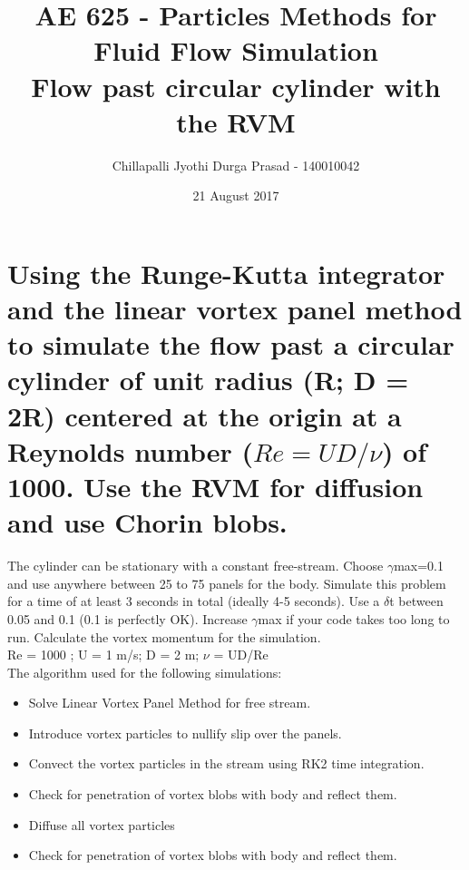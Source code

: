 \documentclass[a4paper,11pt]{article}
\title{AE 625 - Particles Methods for Fluid Flow Simulation \\ Flow past circular cylinder with the RVM}
\author{Chillapalli Jyothi Durga Prasad - 140010042 }
\date{21 August 2017}
\begin{document}
\maketitle


\tableofcontents
\listoffigures


\newpage
\section*{Using the Runge-Kutta integrator and the linear vortex panel method to simulate the flow past a circular cylinder of unit radius (R; D = 2R) centered at the origin at a Reynolds number ($Re = U D/\nu$) of 1000. Use the RVM for diffusion and use Chorin blobs.}

\indent The cylinder can be stationary with a constant free-stream. Choose $\gamma$max=0.1 and use anywhere between 25 to 75 panels for the body. Simulate this problem for a time of at least 3 seconds in total (ideally 4-5 seconds). Use a $\delta$t between 0.05 and 0.1 (0.1 is perfectly OK). Increase $\gamma$max if your code takes too long to run. Calculate the vortex momentum for the simulation.\\

Re = 1000 ; U = 1 m/s; D = 2 m; $\nu$ = UD/Re\\

The algorithm used for the following simulations:\\

\begin{centering}
\begin{itemize}
  \item Solve Linear Vortex Panel Method for free stream.\\
  \item Introduce vortex particles to nullify slip over the panels. \\
  \item Convect the vortex particles in the stream using RK2 time integration.\\
  \item Check for penetration of vortex blobs with body and reflect them.\\
  \item Diffuse all vortex particles\\
  \item Check for penetration of vortex blobs with body and reflect them.\\

\end{itemize}
\end{centering}
\end{document}
